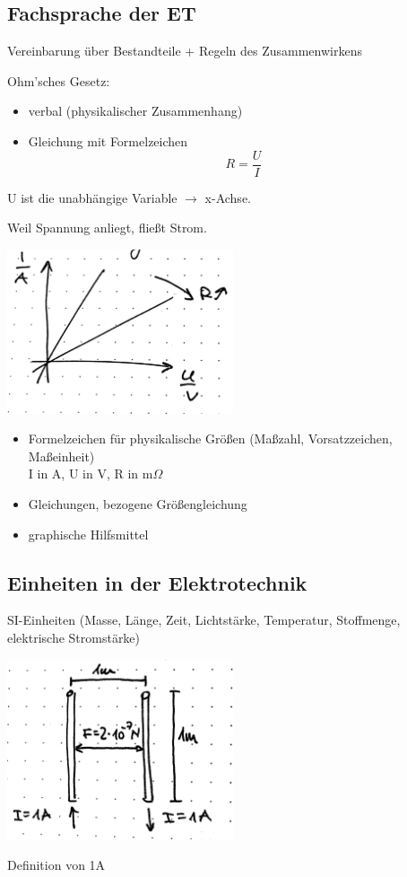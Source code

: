 \documentclass[10pt, a4paper]{article}
\newcommand{\ra}{$\rightarrow$ }
\begin{document}
\subsection{Fachsprache der ET}

Vereinbarung über Bestandteile + Regeln des Zusammenwirkens

 Ohm'sches Gesetz:

\begin{itemize}
	\item verbal (physikalischer Zusammenhang)
	\item Gleichung mit Formelzeichen\\
		$$R = \frac{U}{I}$$
\end{itemize}

U ist die unabhängige Variable \ra x-Achse.

\glqq Weil Spannung anliegt, fließt Strom.\grqq

\begin{center}
\includegraphics[width=0.5\textwidth]{img/2}
\end{center}

\begin{itemize}
	\item Formelzeichen für physikalische Größen 
		(Maßzahl, Vorsatzzeichen, Maßeinheit)\\
		I in A, U in V, R in m$\Omega$
	\item Gleichungen, bezogene Größengleichung
	\item graphische Hilfsmittel
\end{itemize}

\subsection{Einheiten in der Elektrotechnik}

SI-Einheiten (Masse, Länge, Zeit, Lichtstärke, Temperatur, Stoffmenge, elektrische Stromstärke)

\begin{center}
\includegraphics[width=0.5\textwidth]{img/3}
\end{center}
Definition von 1A
\end{document}
